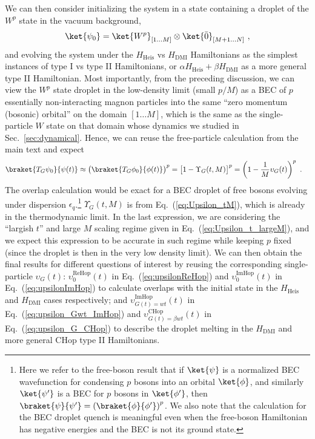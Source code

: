 \documentclass[prx,letterpaper,aps,superscriptaddress,floatfix,twocolumn,nofootinbib]{revtex4-2}
\theoremstyle{definition}
\begin{document}
%
We can then consider initializing the system in a state containing a droplet of the $W^p$ state in the vacuum background,
\begin{equation}
\ket{\psi_0} = \ket{W^p}_{[1\dots M]} \otimes \ket{\bar{0}}_{[M+1 \dots N]} ~,
\end{equation}
and evolving the system under the $H_{\text{Heis}}$ vs $H_{\text{DMI}}$ Hamiltonians as the simplest instances of type I vs type II Hamiltonians, or $\alpha H_{\text{Heis}} + \beta H_{\text{DMI}}$ as a more general type II Hamiltonian.
% 
Most importantly, from the preceding discussion, we can view the $W^p$ state droplet in the low-density limit (small $p/M$) as a BEC of $p$ essentially non-interacting magnon particles into the same ``zero momentum (bosonic) orbital'' on the domain $[1 \dots M]$, which is the same as the single-particle $W$ state on that domain whose dynamics we studied in Sec.~\ref{sec:dynamical}.
% 
Hence, we can reuse the free-particle calculation from the main text and expect
\begin{align}
\braket{T_G \psi_0}{\psi(t)} &\approx \big( \braket{T_G \phi_0}{\phi(t)} \big)^p = \big[1 -  \Upsilon_G(t,M) \big]^p = \left( 1 -  \frac{1}{M} \upsilon_G(t) \right)^p ~.
\label{eq:Wpoverlap}
\end{align}
%
The overlap calculation would be exact for a BEC droplet of free bosons evolving under dispersion $\epsilon_q$.\footnote{Here we refer to the free-boson result that if $\ket{\psi}$ is a normalized BEC wavefunction for condensing $p$ bosons into an orbital $\ket{\phi}$, and similarly $\ket{\psi'}$ is a BEC for $p$ bosons in $\ket{\phi'}$, then $\braket{\psi}{\psi'} = \left(\braket{\phi}{\phi'}\right)^p$.
We also note that the calculation for the BEC droplet quench is meaningful even when the free-boson Hamiltonian has negative energies and the BEC is not its ground state.}
$\Upsilon_G(t,M)$ is from Eq.~(\ref{eq:Upsilon_tM}), which is already in the thermodynamic limit. 
%
In the last expression, we are considering the ``largish $t$'' and large $M$ scaling regime given in Eq.~(\ref{eq:Upsilon_t_largeM}), and we expect this expression to be accurate in such regime while keeping $p$ fixed (since the droplet is then in the very low density limit).
%
We can then obtain the final results for different questions of interest by reusing the corresponding single-particle $\upsilon_G(t)$:
$\upsilon^{\text{ReHop}}_0(t)$ in Eq.~(\ref{eq:upsilonReHop}) and $\upsilon^{\text{ImHop}}_0(t)$ in Eq.~(\ref{eq:upsilonImHop}) to calculate overlaps with the initial state in the $H_{\text{Heis}}$ and $H_{\text{DMI}}$ cases respectively;
and $\upsilon^{\text{ImHop}}_{G(t)=wt}(t)$ in Eq.~(\ref{eq:upsilon_Gwt_ImHop}) and $\upsilon^{\text{CHop}}_{G(t)=\beta wt}(t)$ in Eq.~(\ref{eq:upsilon_G_CHop}) to describe the droplet melting in the $H_{\text{DMI}}$ and more general CHop type II Hamiltonians.
%
\end{document}
